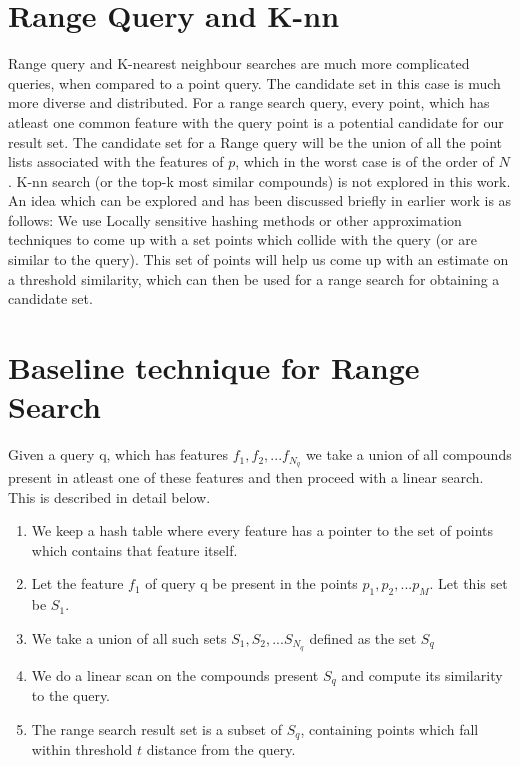 \section{Range Query and K-nn}
Range query and K-nearest neighbour searches are much more complicated queries, when compared to a point query. The candidate set in this case is much more diverse and distributed. 
For a range search query, every point, which has atleast one common feature with the query point is a potential candidate for our result set. The candidate set for a Range query will be the union of all the point lists associated with the features of $p$, which in the worst case is of the order of $N$. 
K-nn search (or the top-k most similar compounds) is not explored in this work. An idea which can be explored and has been discussed briefly in earlier work is as follows: We use Locally sensitive hashing methods or other approximation techniques to come up with a set points which collide with the query (or are similar to the query). This set of points will help us come up with an estimate on a threshold similarity, which can then be used for a range search for obtaining a candidate set.

\section{Baseline technique for Range Search}
\label{sec:base}
 Given a query q, which has features $f_1, f_2,...f_{N_q}$ we take a union of all compounds present in atleast one of these features and then proceed with a linear search. This is described in detail below.

\begin{enumerate}
	\item We keep a hash table where every feature has a pointer to the set of points which contains that feature itself.
	\item Let the feature $f_1$ of query q be present in the points $p_1,p_2,...p_M$. Let this set be $S_1$.
	\item We take a union of all such sets $S_1, S_2,...S_{N_q}$ defined as the set $S_q$
	\item We do a linear scan on the compounds present $S_q$ and compute its similarity to the query.
	\item The range search result set is a subset of $S_q$, containing points which fall within threshold $t$ distance from the query.	 
\end{enumerate}



